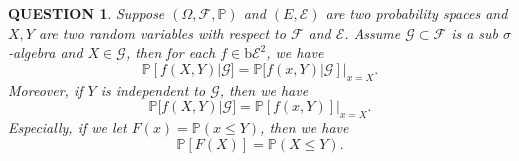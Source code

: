 \documentclass[12pt]{article}
\renewcommand{\(}{\left(}%
\renewcommand{\)}{\right)}%
\renewcommand{\[}{\left[}%
\renewcommand{\]}{\right]}%
\newcommand{\p}{\mathbb{P}}
\newcommand{\f}{\mathscr{F}}
\newcommand{\e}{\mathscr{E}}
\newcommand{\g}{\mathscr{G}}
\newtheorem{question}{QUESTION}[section]}
\begin{document}
  \begin{question}
   Suppose $(\Omega,\f,\p )$ and $(E,\e)$ are two probability spaces and $X,Y$ are two random variables with respect to $\f$ and $\e$. Assume $\g\subset\f$ is a sub $\sigma$-algebra and $X\in\g$, then for each $f\in\mathrm{b}\e^2$, we have
   \begin{equation*}
    \p[f(X,Y)|\g]=\p[f(x,Y)|\g]|_{x=X}.
   \end{equation*}
   Moreover, if $Y$ is independent to $\g$, then we have
   \begin{equation*}
    \p[f(X,Y)|\g]=\p[f(x,Y)]|_{x=X}.
   \end{equation*}
   Especially, if we let $F(x)=\p(x\leq Y)$, then we have
   \begin{equation*}
    \p[F(X)]=\p(X\leq Y).
   \end{equation*}
  \end{question}
\end{document}

